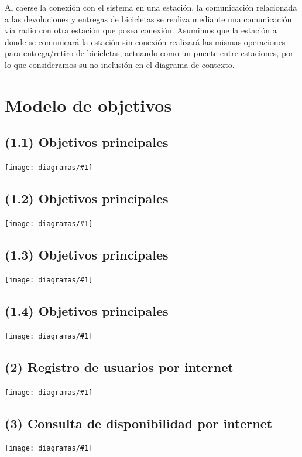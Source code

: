 \documentclass[a4paper, 10pt, twoside]{article}
\newcommand{\diagramav}[1]{
  \texttt{[image: diagramas/\#1]}
}
\newcommand{\diagramah}[1]{
  \texttt{[image: diagramas/\#1]}
}
\begin{document}
Al caerse la conexión con el sistema en una estación, la comunicación relacionada a las devoluciones y entregas de bicicletas se realiza
mediante una comunicación vía radio con otra estación que posea conexión.
Asumimos que la estación a donde se comunicará la estación sin conexión realizará las mismas operaciones para entrega/retiro de bicicletas, actuando como un puente entre estaciones, por lo que consideramos su no inclusión en el diagrama de contexto.



\section{Modelo de objetivos}

\subsection{(1.1)  Objetivos principales}
\diagramav{objetivos-1.1}

\subsection{(1.2)  Objetivos principales}
\diagramah{objetivos-1.2}

\subsection{(1.3)  Objetivos principales}
\diagramav{objetivos-1.3}

\subsection{(1.4)  Objetivos principales}
\diagramah{objetivos-1.4}

\subsection{(2)    Registro de usuarios por internet}
\diagramah{objetivos-2}

\subsection{(3)    Consulta de disponibilidad por internet}
\diagramah{objetivos-3}
\end{document}
